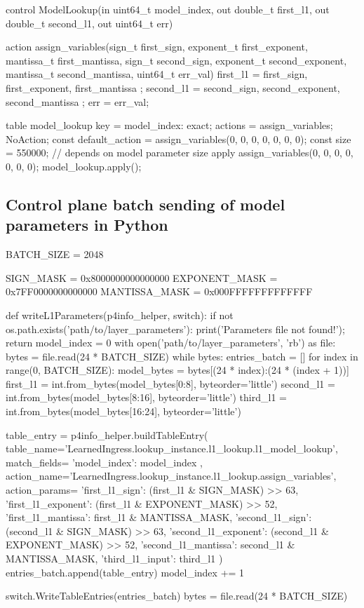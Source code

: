 \begin{P4}
control ModelLookup(in uint64_t model_index, out double_t first_l1, out double_t second_l1, out uint64_t err) {

  action assign_variables(sign_t first_sign, exponent_t first_exponent, mantissa_t first_mantissa,
                          sign_t second_sign, exponent_t second_exponent, mantissa_t second_mantissa,
                          uint64_t err_val) {
      first_l1 = { first_sign, first_exponent, first_mantissa };
      second_l1 = { second_sign, second_exponent, second_mantissa };
      err = err_val;
  }

  table model_lookup {
      key = {
          model_index: exact;
      }
      actions = {
          assign_variables;
          NoAction;
      }
      const default_action = assign_variables(0, 0, 0, 0, 0, 0, 0);
      const size = 550000; // depends on model parameter size
  }
  apply {
      assign_variables(0, 0, 0, 0, 0, 0, 0);
      model_lookup.apply();
  }
}\end{P4}

\subsection{Control plane batch sending of model parameters in Python}
\label{sect:appendix:sending_params}

\begin{python}
BATCH_SIZE = 2048

SIGN_MASK = 0x8000000000000000
EXPONENT_MASK = 0x7FF0000000000000
MANTISSA_MASK = 0x000FFFFFFFFFFFFF

def writeL1Parameters(p4info_helper, switch):
  if not os.path.exists('path/to/layer_parameters'): print('Parameters file not found!'); return
  model_index = 0
  with open('path/to/layer_parameters', 'rb') as file:
    bytes = file.read(24 * BATCH_SIZE)
    while bytes:
      entries_batch = []
      for index in range(0, BATCH_SIZE):
        model_bytes = bytes[(24 * index):(24 * (index + 1))]
        first_l1 = int.from_bytes(model_bytes[0:8], byteorder='little')
        second_l1 = int.from_bytes(model_bytes[8:16], byteorder='little')
        third_l1 = int.from_bytes(model_bytes[16:24], byteorder='little')

        table_entry = p4info_helper.buildTableEntry(
          table_name='LearnedIngress.lookup_instance.l1_lookup.l1_model_lookup',
          match_fields={ 'model_index': model_index },
          action_name='LearnedIngress.lookup_instance.l1_lookup.assign_variables',
          action_params={
            'first_l1_sign': (first_l1 & SIGN_MASK) >> 63,
            'first_l1_exponent': (first_l1 & EXPONENT_MASK) >> 52,
            'first_l1_mantissa': first_l1 & MANTISSA_MASK,
            'second_l1_sign': (second_l1 & SIGN_MASK) >> 63,
            'second_l1_exponent': (second_l1 & EXPONENT_MASK) >> 52,
            'second_l1_mantissa': second_l1 & MANTISSA_MASK,
            'third_l1_input': third_l1
          })
        entries_batch.append(table_entry)
        model_index += 1

      switch.WriteTableEntries(entries_batch)
      bytes = file.read(24 * BATCH_SIZE)\end{python}

